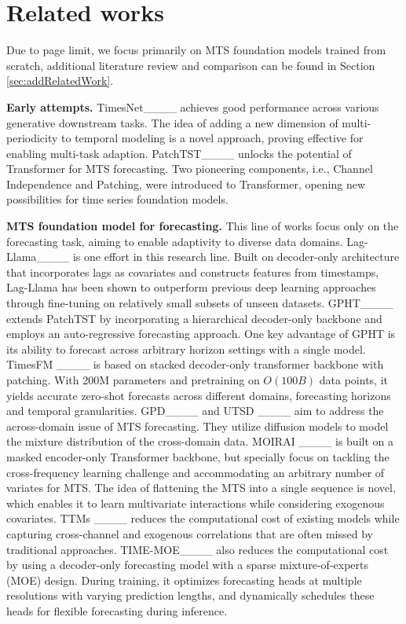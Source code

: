\section{Related works}
\label{related}

Due to page limit, we focus primarily on MTS foundation models trained from scratch, 
additional literature review and comparison can be found in Section \ref{sec:addRelatedWork}.  

   

 

{\bf Early attempts.}  
TimesNet____ achieves good performance across various generative downstream tasks.
The idea of adding a new dimension of multi-periodicity to 
temporal modeling is a novel approach, proving effective for enabling multi-task adaption.  
PatchTST____ unlocks the potential of 
Transformer for MTS forecasting.   
Two pioneering components, 
i.e., Channel Independence and Patching, 
were introduced to Transformer, 
opening new possibilities for 
time series foundation models.    

{\bf MTS foundation model for forecasting.} 
This line of works focus only on the forecasting task, 
aiming to enable adaptivity to diverse data domains.  
Lag-Llama____ is one effort in this research line. Built on decoder-only architecture that incorporates lags as covariates and constructs features from timestamps, Lag-Llama has been shown to outperform previous deep learning approaches through fine-tuning on relatively small subsets of unseen datasets.  
GPHT____ extends PatchTST by incorporating a hierarchical decoder-only backbone and employs an auto-regressive forecasting approach. One key advantage of GPHT is its ability to forecast across arbitrary horizon settings with a single model.  
TimesFM ____ is based on stacked decoder-only 
transformer backbone with patching.  
With 200M parameters and pretraining on $O(100B)$ data points, 
it yields accurate zero-shot forecasts  
across different domains, 
forecasting horizons and temporal granularities.  
GPD____ and UTSD ____ 
aim to address the across-domain issue of 
MTS forecasting. 
They utilize diffusion models to model 
the mixture distribution of the cross-domain data. 
MOIRAI ____ is built on a masked encoder-only Transformer backbone, but specially focus on 
tackling the cross-frequency learning challenge and 
accommodating an arbitrary number
of variates for MTS. 
The idea of flattening the MTS into a single sequence is novel, 
which enables it to learn multivariate interactions while considering exogenous covariates.   
TTMs ____ reduces the computational cost of existing models while capturing cross-channel and exogenous correlations that are often missed by traditional approaches. 
TIME-MOE____ also reduces the 
computational cost by using a decoder-only forecasting model with a sparse mixture-of-experts (MOE) design. During training, it optimizes forecasting heads at multiple resolutions with varying prediction lengths, and dynamically schedules these heads for flexible forecasting during inference.  

